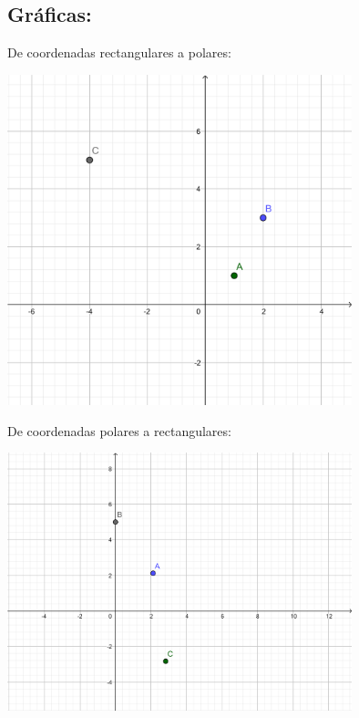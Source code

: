 \documentclass[letterpaper, 12pt]{article}
\begin{document}
\subsection*{Gráficas: }
De coordenadas rectangulares a polares:\\
\begin{center}
    \includegraphics[width=10cm]{graph2.png}
\end{center}
De coordenadas polares a rectangulares:\\
\begin{center}
    \includegraphics[width=10cm]{graph1.png}
\end{center}
\end{document}
